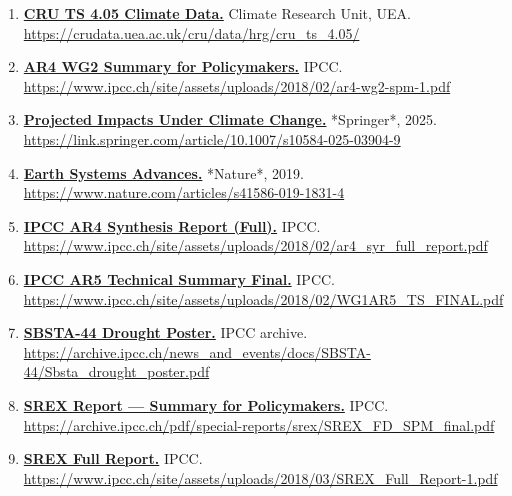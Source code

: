 \documentclass[
  10pt,
  a4paper,
  DIV=11,
  numbers=noendperiod,
  open=any]{scrreprt}
\numberwithin{equation}{chapter}
\numberwithin{equation}{section}
\renewcommand{\[}{\begin{equation}}
\renewcommand{\]}{\end{equation}}
\begin{document}
\begin{enumerate}
  \item \label{ref:web15}\href{https://crudata.uea.ac.uk/cru/data/hrg/cru_ts_4.05/}{\textbf{CRU TS 4.05 Climate Data.}} Climate Research Unit, UEA.  
  \url{https://crudata.uea.ac.uk/cru/data/hrg/cru_ts_4.05/}

  \item \label{ref:web16}\href{https://www.ipcc.ch/site/assets/uploads/2018/02/ar4-wg2-spm-1.pdf}{\textbf{AR4 WG2 Summary for Policymakers.}} IPCC.  
  \url{https://www.ipcc.ch/site/assets/uploads/2018/02/ar4-wg2-spm-1.pdf}

  \item \label{ref:web17}\href{https://link.springer.com/article/10.1007/s10584-025-03904-9}{\textbf{Projected Impacts Under Climate Change.}} *Springer*, 2025.  
  \url{https://link.springer.com/article/10.1007/s10584-025-03904-9}

  \item \label{ref:web18}\href{https://www.nature.com/articles/s41586-019-1831-4}{\textbf{Earth Systems Advances.}} *Nature*, 2019.  
  \url{https://www.nature.com/articles/s41586-019-1831-4}

  \item \label{ref:web19}\href{https://www.ipcc.ch/site/assets/uploads/2018/02/ar4_syr_full_report.pdf}{\textbf{IPCC AR4 Synthesis Report (Full).}} IPCC.  
  \url{https://www.ipcc.ch/site/assets/uploads/2018/02/ar4_syr_full_report.pdf}

  \item \label{ref:web20}\href{https://www.ipcc.ch/site/assets/uploads/2018/02/WG1AR5_TS_FINAL.pdf}{\textbf{IPCC AR5 Technical Summary Final.}} IPCC.  
  \url{https://www.ipcc.ch/site/assets/uploads/2018/02/WG1AR5_TS_FINAL.pdf}

  \item \label{ref:web21}\href{https://archive.ipcc.ch/news_and_events/docs/SBSTA-44/Sbsta_drought_poster.pdf}{\textbf{SBSTA-44 Drought Poster.}} IPCC archive.  
  \url{https://archive.ipcc.ch/news_and_events/docs/SBSTA-44/Sbsta_drought_poster.pdf}

  \item \label{ref:web22}\href{https://archive.ipcc.ch/pdf/special-reports/srex/SREX_FD_SPM_final.pdf}{\textbf{SREX Report — Summary for Policymakers.}} IPCC.  
  \url{https://archive.ipcc.ch/pdf/special-reports/srex/SREX_FD_SPM_final.pdf}

  \item \label{ref:web23}\href{https://www.ipcc.ch/site/assets/uploads/2018/03/SREX_Full_Report-1.pdf}{\textbf{SREX Full Report.}} IPCC.  
  \url{https://www.ipcc.ch/site/assets/uploads/2018/03/SREX_Full_Report-1.pdf}


\end{enumerate}
\end{document}
